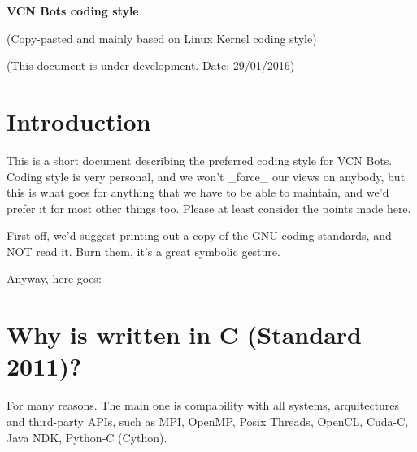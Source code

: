 \documentclass[pdftex,12pt, twocol]{article} %
\begin{document}
\begin{titlepage}
\begin{center}
		{\Huge \bf VCN Bots coding style}

(Copy-pasted and mainly based on Linux Kernel coding style)

(This document is under development. Date: 29/01/2016)
\end{center}
\end{titlepage}

\newpage
\tableofcontents

\newpage
\section{Introduction}
This is a short document describing the preferred coding style for VCN
Bots.  Coding style is very personal, and we won't \_force\_ our
views on anybody, but this is what goes for anything that we have to be
able to maintain, and we'd prefer it for most other things too.  Please
at least consider the points made here.

First off, we'd suggest printing out a copy of the GNU coding standards,
and NOT read it.  Burn them, it's a great symbolic gesture.

Anyway, here goes:

\section{Why is written in C (Standard 2011)?}
For many reasons. The main one is compability with all systems, arquitectures
and third-party APIs, such as MPI, OpenMP, Posix Threads, OpenCL, Cuda-C,
Java NDK, Python-C (Cython).
\end{document}

